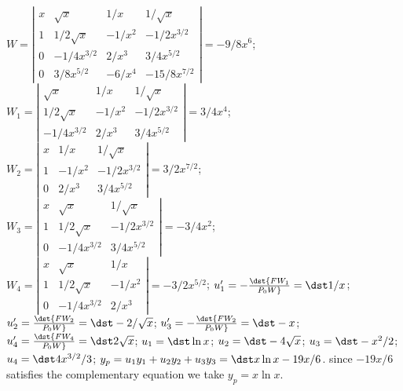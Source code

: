 \documentclass[dvips]{book}
\renewcommand{\exer}[1]{\par\medskip\;\noindent{\color{red}\bf #1.}}
\numberwithin{example}{section}
\numberwithin{equation}{section}
\numberwithin{theorem}{section}
\numberwithin{table}{section}
\numberwithin{figure}{section}
\begin{document}
\exer{9.4.32}
$W=\left|\begin{array}{cccc}
x&\sqrt{x}&1/x&1/\sqrt{x}\\
1&1/2\sqrt{x}&-1/x^2&-1/2x^{3/2}\\
0&-1/4x^{3/2}&2/x^3&3/4x^{5/2}\\
0&3/8x^{5/2}&-6/x^4&-15/8x^{7/2}
\end{array}\right|=-9/8x^6$;
$W_1=\left|\begin{array}{cccc}
\sqrt{x}&1/x&1/\sqrt{x}\\
1/2\sqrt{x}&-1/x^2&-1/2x^{3/2}\\
-1/4x^{3/2}&2/x^3&3/4x^{5/2}\end{array}\right|=3/4x^4$;
$W_2=\left|\begin{array}{cccc}
x&1/x&1/\sqrt{x}\\1&-1/x^2&-1/2x^{3/2}\\
0&2/x^3&3/4x^{5/2}\end{array}\right|=3/2x^{7/2}$;
$W_3=\left|\begin{array}{cccc}
x&\sqrt{x}&1/\sqrt{x}\\
1&1/2\sqrt{x}&-1/2x^{3/2}\\0&-1/4x^{3/2}&3/4x^{5/2}
\end{array}\right|=-3/4x^2$;
$W_4=\left|\begin{array}{cccc}
x&\sqrt{x}&1/x\\1&1/2\sqrt{x}&-1/x^2\\
0&-1/4x^{3/2}&2/x^3\end{array}\right|=-3/2x^{5/2}$;
$u_1'=-\dst{FW_1\over P_0W}=\dst 1/x$;
$u_2'=\dst{FW_2\over P_0W}=\dst-2/\sqrt{x}$;
$u_3'=-\dst{FW_2\over P_0W}=\dst-x$;
$u_4'=\dst{FW_4\over P_0W}=\dst2\sqrt{x}$;
$u_1=\dst\ln x$;
$u_2=\dst-4\sqrt{x}$;
$u_3=\dst-x^2/2$;
$u_4=\dst4x^{3/2}/3$;
$y_p=u_1y_1+u_2y_2+u_3y_3=\dst x\ln x-19x/6$.
since $-19x/6$ satisfies the complementary equation we take
$y_p=x\ln x$.
\end{document}
